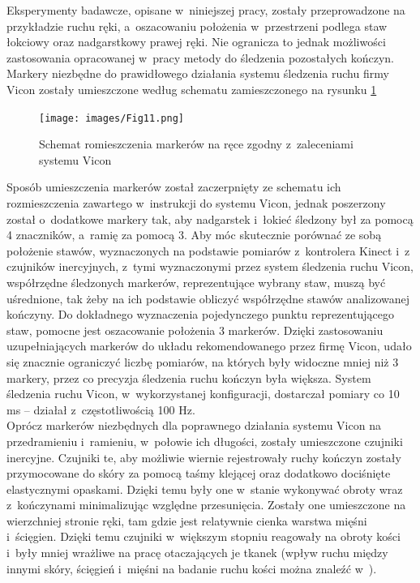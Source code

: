  
Eksperymenty badawcze, opisane w~niniejszej pracy, zostały przeprowadzone na przykładzie ruchu ręki, a~oszacowaniu położenia w~przestrzeni podlega staw łokciowy oraz nadgarstkowy prawej ręki. Nie ogranicza to jednak możliwości zastosowania opracowanej w~pracy metody do śledzenia pozostałych kończyn. Markery niezbędne do prawidłowego działania systemu śledzenia ruchu firmy Vicon zostały umieszczone według schematu zamieszczonego na rysunku \ref{fig:experiments:viconArm}

\begin{figure}[!htp]
	\centering
	\texttt{[image: images/Fig11.png]}
	\caption{Schemat romieszczenia markerów na ręce zgodny z~zaleceniami systemu Vicon}
	\label{fig:experiments:viconArm}
\end{figure}

Sposób umieszczenia markerów został zaczerpnięty ze schematu ich rozmieszczenia zawartego w~instrukcji do systemu Vicon, jednak poszerzony został o~dodatkowe markery tak, aby nadgarstek i~łokieć śledzony był za pomocą 4 znaczników, a~ramię za pomocą 3. Aby móc skutecznie porównać ze sobą położenie stawów, wyznaczonych na podstawie pomiarów z~kontrolera Kinect i~z czujników inercyjnych, z~tymi wyznaczonymi przez system śledzenia ruchu Vicon, współrzędne śledzonych markerów, reprezentujące wybrany staw, muszą być uśrednione, tak żeby na ich podstawie obliczyć współrzędne stawów analizowanej kończyny. Do dokładnego wyznaczenia pojedynczego punktu reprezentującego staw, pomocne jest oszacowanie położenia 3 markerów. Dzięki zastosowaniu uzupełniających markerów do układu rekomendowanego przez firmę Vicon, udało się znacznie ograniczyć liczbę pomiarów, na których były widoczne mniej niż 3 markery, przez co precyzja śledzenia ruchu kończyn była większa. System śledzenia ruchu Vicon, w~wykorzystanej konfiguracji, dostarczał pomiary co 10 ms -- działał z~częstotliwością 100 Hz.  \\ 

Oprócz markerów niezbędnych dla poprawnego działania systemu Vicon na przedramieniu i~ramieniu, w~połowie ich długości, zostały umieszczone czujniki inercyjne. Czujniki te, aby możliwie wiernie rejestrowały ruchy kończyn zostały przymocowane do skóry za pomocą taśmy klejącej oraz dodatkowo dociśnięte elastycznymi opaskami. Dzięki temu były one w~stanie wykonywać obroty wraz z~kończynami minimalizując względne przesunięcia. Zostały one umieszczone na wierzchniej stronie ręki, tam gdzie jest relatywnie cienka warstwa mięśni i~ścięgien. Dzięki temu czujniki w~większym stopniu reagowały na obroty kości i~były mniej wrażliwe na pracę otaczających je tkanek (wpływ ruchu między innymi skóry, ścięgień i~mięśni na badanie ruchu kości można znaleźć w~\cite{Sati2016,Reinschmidt2016}).

